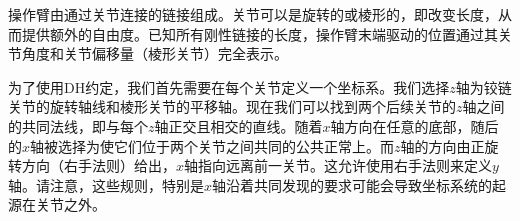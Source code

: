 
操作臂由通过关节连接的链接组成。关节可以是旋转的或棱形的，即改变长度，从而提供额外的自由度。已知所有刚性链接的长度，操作臂末端驱动的位置通过其关节角度和关节偏移量（棱形关节）完全表示。



为了使用DH约定，我们首先需要在每个关节定义一个坐标系。我们选择$z$轴为铰链关节的旋转轴线和棱形关节的平移轴。现在我们可以找到两个后续关节的$z$轴之间的共同法线，即与每个$z$轴正交且相交的直线。随着$x$轴方向在任意的底部，随后的$x$轴被选择为使它们位于两个关节之间共同的公共正常上。而$z$轴的方向由正旋转方向（右手法则）给出，$x$轴指向远离前一关节。这允许使用右手法则来定义$y$轴。请注意，这些规则，特别是$x$轴沿着共同发现的要求可能会导致坐标系统的起源在关节之外。 


